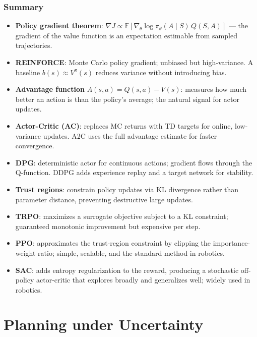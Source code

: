 \documentclass[11pt,a4paper]{article}
\theoremstyle{definition}
\theoremstyle{plain}
\theoremstyle{remark}
\begin{document}
\section{Summary}

\begin{itemize}
    \item \textbf{Policy gradient theorem}: $\nabla J \propto \mathbb{E}[\nabla_\theta \log \pi_\theta(A \mid S)\, Q(S,A)]$ — the gradient of the value function is an expectation estimable from sampled trajectories.
    \item \textbf{REINFORCE}: Monte Carlo policy gradient; unbiased but high-variance. A baseline $b(s) \approx V^\pi(s)$ reduces variance without introducing bias.
    \item \textbf{Advantage function} $A(s,a) = Q(s,a) - V(s)$: measures how much better an action is than the policy's average; the natural signal for actor updates.
    \item \textbf{Actor-Critic (AC)}: replaces MC returns with TD targets for online, low-variance updates. A2C uses the full advantage estimate for faster convergence.
    \item \textbf{DPG}: deterministic actor for continuous actions; gradient flows through the Q-function. DDPG adds experience replay and a target network for stability.
    \item \textbf{Trust regions}: constrain policy updates via KL divergence rather than parameter distance, preventing destructive large updates.
    \item \textbf{TRPO}: maximizes a surrogate objective subject to a KL constraint; guaranteed monotonic improvement but expensive per step.
    \item \textbf{PPO}: approximates the trust-region constraint by clipping the importance-weight ratio; simple, scalable, and the standard method in robotics.
    \item \textbf{SAC}: adds entropy regularization to the reward, producing a stochastic off-policy actor-critic that explores broadly and generalizes well; widely used in robotics.
\end{itemize}

\part{Planning under Uncertainty}
\end{document}

